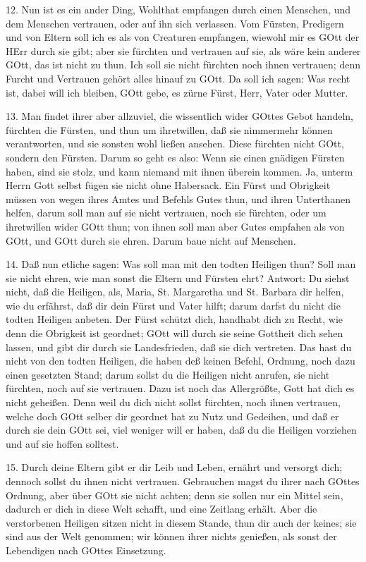 12. Nun ist es ein ander Ding, Wohlthat empfangen durch einen Menschen, und dem Menschen vertrauen, oder auf ihn sich verlassen. Vom Fürsten, Predigern und von Eltern soll ich es als von Creaturen empfangen, wiewohl mir es GOtt der HErr durch sie gibt; aber sie fürchten und vertrauen auf sie, als wäre kein anderer GOtt, das ist nicht zu thun. Ich soll sie nicht fürchten noch ihnen vertrauen; denn Furcht und Vertrauen gehört alles hinauf zu GOtt. Da soll ich sagen: Was recht ist, dabei will ich bleiben, GOtt gebe, es zürne Fürst, Herr, Vater oder Mutter.

13. Man findet ihrer aber allzuviel, die wissentlich wider GOttes Gebot handeln, fürchten die Fürsten, und thun um ihretwillen, daß sie nimmermehr können verantworten, und sie sonsten wohl ließen ansehen. Diese fürchten nicht GOtt, sondern den Fürsten. Darum so geht es also: Wenn sie einen gnädigen Fürsten haben, sind sie stolz, und kann niemand mit ihnen überein kommen. Ja, unterm Herrn Gott selbst fügen sie nicht ohne Habersack. Ein Fürst und Obrigkeit müssen von wegen ihres Amtes und Befehls Gutes thun, und ihren Unterthanen helfen, darum soll man auf sie nicht vertrauen, noch sie fürchten, oder um ihretwillen wider GOtt thun; von ihnen soll man aber Gutes empfahen als von GOtt, und GOtt durch sie ehren. Darum baue nicht auf Menschen.

14. Daß nun etliche sagen: Was soll man mit den todten Heiligen thun? Soll man sie nicht ehren, wie man sonst die Eltern und Fürsten ehrt? Antwort: Du siehst nicht, daß die Heiligen, als, Maria, St. Margaretha und St. Barbara dir helfen, wie du erfährst, daß dir dein Fürst und Vater hilft; darum darfst du nicht die todten Heiligen anbeten. Der Fürst schützt dich, handhabt dich zu Recht, wie denn die Obrigkeit ist geordnet; GOtt will durch sie seine Gottheit dich sehen lassen, und gibt dir durch sie Landesfrieden, daß sie dich vertreten. Das hast du nicht von den todten Heiligen, die haben deß keinen Befehl, Ordnung, noch dazu einen gesetzten Stand; darum sollst du die Heiligen nicht anrufen, sie nicht fürchten, noch auf sie vertrauen. Dazu ist noch das Allergrößte, Gott hat dich es nicht geheißen. Denn weil du
dich nicht sollst fürchten, noch ihnen vertrauen, welche doch GOtt selber dir geordnet hat zu Nutz und Gedeihen, und daß er durch sie dein GOtt sei, viel weniger will er haben, daß du die Heiligen vorziehen und auf sie hoffen solltest.

15. Durch deine Eltern gibt er dir Leib und Leben, ernährt und versorgt dich; dennoch sollst du ihnen nicht vertrauen. Gebrauchen magst du ihrer nach GOttes Ordnung, aber über GOtt sie nicht achten; denn sie sollen nur ein Mittel sein, dadurch er dich in diese Welt schafft, und eine Zeitlang erhält. Aber die verstorbenen Heiligen sitzen nicht in diesem Stande, thun dir auch der keines; sie sind aus der Welt genommen; wir können ihrer nichts genießen, als sonst der Lebendigen nach GOttes Einsetzung.

